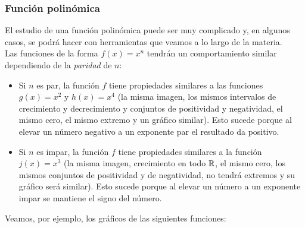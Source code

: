 \documentclass[../Teoría.root.tex]{subfiles}
\begin{document}
        \subsubsection{Función polinómica}
        El estudio de una función polinómica puede ser muy complicado y, en algunos casos, se podrá hacer con herramientas que veamos a lo largo de la materia.\\
        Las funciones de la forma \(f(x) = x^n\) tendrán un comportamiento similar dependiendo de la \textit{paridad} de \(n\):
        \begin{itemize}
            \item Si \(n\) es par, la función \(f\) tiene propiedades similares a las funciones \(g(x) = x^2\) y \(h(x) = x^4\) (la misma imagen, los mismos intervalos de crecimiento y decrecimiento y conjuntos de positividad y negatividad, el mismo cero, el mismo extremo y un gráfico similar). Esto sucede porque al elevar un número negativo a un exponente par el resultado da positivo.
            \item Si \(n\) es impar, la función \(f\) tiene propiedades similares a la función \(j(x) = x^3\) (la misma imagen, crecimiento en todo \(\mathbb{R}\), el mismo cero, los mismos conjuntos de positividad y de negatividad, no tendrá extremos y su gráfico será similar). Esto sucede porque al elevar un número a un exponente impar se mantiene el signo del número.
        \end{itemize}
        Veamos, por ejemplo, los gráficos de las siguientes funciones:
\end{document}

